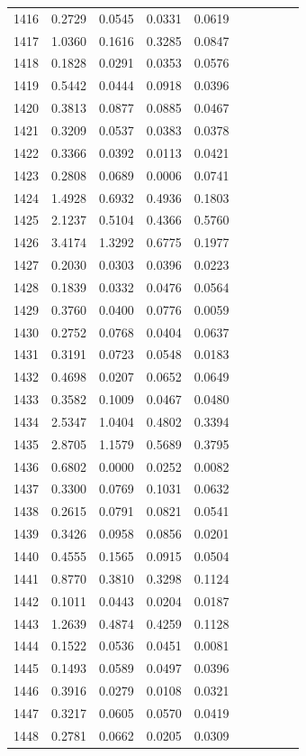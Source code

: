 \begin{table}
\begin{tabular}{cccccccccc}
1416& 0.2729& 0.0545& 0.0331& 0.0619\\ 
1417& 1.0360& 0.1616& 0.3285& 0.0847\\ 
1418& 0.1828& 0.0291& 0.0353& 0.0576\\ 
1419& 0.5442& 0.0444& 0.0918& 0.0396\\ 
1420& 0.3813& 0.0877& 0.0885& 0.0467\\ 
1421& 0.3209& 0.0537& 0.0383& 0.0378\\ 
1422& 0.3366& 0.0392& 0.0113& 0.0421\\ 
1423& 0.2808& 0.0689& 0.0006& 0.0741\\ 
1424& 1.4928& 0.6932& 0.4936& 0.1803\\ 
1425& 2.1237& 0.5104& 0.4366& 0.5760\\ 
1426& 3.4174& 1.3292& 0.6775& 0.1977\\ 
1427& 0.2030& 0.0303& 0.0396& 0.0223\\ 
1428& 0.1839& 0.0332& 0.0476& 0.0564\\ 
1429& 0.3760& 0.0400& 0.0776& 0.0059\\ 
1430& 0.2752& 0.0768& 0.0404& 0.0637\\ 
1431& 0.3191& 0.0723& 0.0548& 0.0183\\ 
1432& 0.4698& 0.0207& 0.0652& 0.0649\\ 
1433& 0.3582& 0.1009& 0.0467& 0.0480\\ 
1434& 2.5347& 1.0404& 0.4802& 0.3394\\ 
1435& 2.8705& 1.1579& 0.5689& 0.3795\\ 
1436& 0.6802& 0.0000& 0.0252& 0.0082\\ 
1437& 0.3300& 0.0769& 0.1031& 0.0632\\ 
1438& 0.2615& 0.0791& 0.0821& 0.0541\\ 
1439& 0.3426& 0.0958& 0.0856& 0.0201\\ 
1440& 0.4555& 0.1565& 0.0915& 0.0504\\ 
1441& 0.8770& 0.3810& 0.3298& 0.1124\\ 
1442& 0.1011& 0.0443& 0.0204& 0.0187\\ 
1443& 1.2639& 0.4874& 0.4259& 0.1128\\ 
1444& 0.1522& 0.0536& 0.0451& 0.0081\\ 
1445& 0.1493& 0.0589& 0.0497& 0.0396\\ 
1446& 0.3916& 0.0279& 0.0108& 0.0321\\ 
1447& 0.3217& 0.0605& 0.0570& 0.0419\\ 
1448& 0.2781& 0.0662& 0.0205& 0.0309\\ 

\end{tabular}
\end{table}
